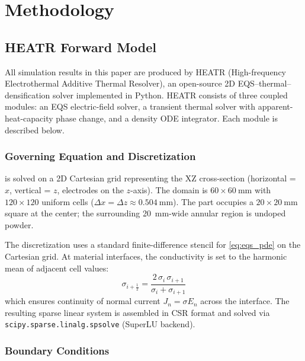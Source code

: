 \documentclass[5p,times]{elsarticle}
\newcommand{\half}{\tfrac{1}{2}}
\begin{document}
\FloatBarrier
\section{Methodology}
\label{sec:methodology}

\subsection{HEATR Forward Model}
\label{sec:eqs_model}

All simulation results in this paper are produced by HEATR
(High-frequency Electrothermal Additive Thermal Resolver), an
open-source 2D EQS--thermal--densification solver implemented in Python.
HEATR consists of three coupled modules: an EQS electric-field solver,
a transient thermal solver with apparent-heat-capacity phase change, and
a density ODE integrator.  Each module is described below.

\subsubsection{Governing Equation and Discretization}

 is solved on a 2D Cartesian grid representing the
XZ cross-section (horizontal = $x$, vertical = $z$, electrodes on the
$z$-axis).  The domain is $60 \times \SI{60}{\milli\meter}$ with
$120 \times 120$ uniform cells ($\Delta x = \Delta z \approx
\SI{0.504}{\milli\meter}$).  The part occupies a $20 \times
\SI{20}{\milli\meter}$ square at the center; the surrounding
\SI{20}{\milli\meter}-wide annular region is undoped powder.

The discretization uses a standard finite-difference stencil for
\cref{eq:eqs_pde} on the Cartesian grid.  At material interfaces, the
conductivity is set to the harmonic mean of adjacent cell values:
\begin{equation}
  \sigma_{i+\half} =
  \frac{2\,\sigma_i\,\sigma_{i+1}}{\sigma_i + \sigma_{i+1}}
  \label{eq:harmonic_sigma}
\end{equation}
which ensures continuity of normal current $J_n = \sigma E_n$ across
the interface.  The resulting sparse linear system is assembled in
CSR format and solved via \texttt{scipy.sparse.linalg.spsolve}
(SuperLU backend).

\subsubsection{Boundary Conditions}
\end{document}
